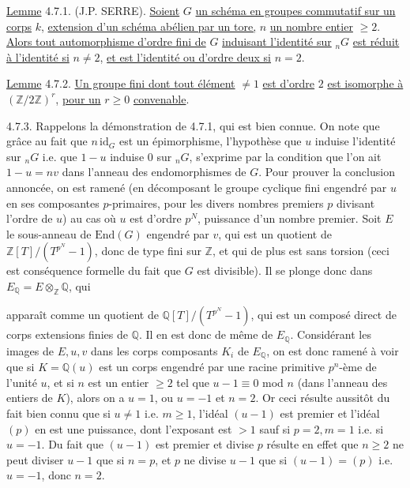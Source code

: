 \underline{Lemme} 4.7.1. (J.P. SERRE). \underline{Soient} $G$ \underline{un schéma en groupes commutatif sur un corps} $k$, \underline{extension d'un schéma abélien par un tore,} $n$ \underline{un nombre entier} $\geq 2$. \underline{Alors tout automorphisme d'ordre fini de} $G$ \underline{induisant l'identité sur} ${}_nG$ \underline{est réduit à l'identité si} $n \neq 2$, \underline{et est l'identité ou d'ordre deux si} $n = 2$.

\underline{Lemme} 4.7.2. \underline{Un groupe fini dont tout élément} $\neq 1$ \underline{est d'ordre} $2$ \underline{est isomorphe à} $(\mathbb{Z}/2\mathbb{Z})^r$, \underline{pour un} $r \geq 0$ \underline{convenable}.

4.7.3. Rappelons la démonstration de 4.7.1, qui est bien connue. On note que grâce au fait que $n\,\mathrm{id}_G$ est un épimorphisme, l'hypothèse que $u$ induise l'identité sur ${}_nG$ i.e. que $1 - u$ induise $0$ sur ${}_nG$, s'exprime par la condition que l'on ait $1 - u = nv$ dans l'anneau des endomorphismes de $G$. Pour prouver la conclusion annoncée, on est ramené (en décomposant le groupe cyclique fini engendré par $u$ en ses composantes $p$-primaires, pour les divers nombres premiers $p$ divisant l'ordre de $u$) au cas où $u$ est d'ordre $p^N$, puissance d'un nombre premier. Soit $E$ le sous-anneau de $\mathrm{End}(G)$ engendré par $v$, qui est un quotient de $\mathbb{Z}[T]/(T^{p^N}-1)$, donc de type fini sur $\mathbb{Z}$, et qui de plus est sans torsion (ceci est conséquence formelle du fait que $G$ est divisible). Il se plonge donc dans $E_{\mathbb{Q}} = E\otimes_{\mathbb{Z}} \mathbb{Q}$, qui



apparaît comme un quotient de $\mathbb{Q}[T]/(T^{p^N}-1)$, qui est un composé direct de corps extensions finies de $\mathbb{Q}$. Il en est donc de même de $E_{\mathbb{Q}}$. Considérant les images de $E,u,v$ dans les corps composants $K_i$ de $E_{\mathbb{Q}}$, on est donc ramené à voir que si $K = \mathbb{Q}(u)$ est un corps engendré par une racine primitive $p^n$-ème de l'unité $u$, et si $n$ est un entier $\geq 2$ tel que $u-1 \equiv 0$ mod $n$ (dans l'anneau des entiers de $K$), alors on a $u=1$, ou $u=-1$ et $n=2$. Or ceci résulte aussitôt du fait bien connu que si $u \neq 1$ i.e. $m \geq 1$, l'idéal $(u-1)$ est premier et l'idéal $(p)$ en est une puissance, dont l'exposant est $> 1$ sauf si $p=2,m=1$ i.e. si $u=-1$. Du fait que $(u-1)$ est premier et divise $p$ résulte en effet que $n \geq 2$ ne peut diviser $u-1$ que si $n=p$, et $p$ ne divise $u-1$ que si $(u-1) = (p)$ i.e. $u = -1$, donc $n = 2$.

